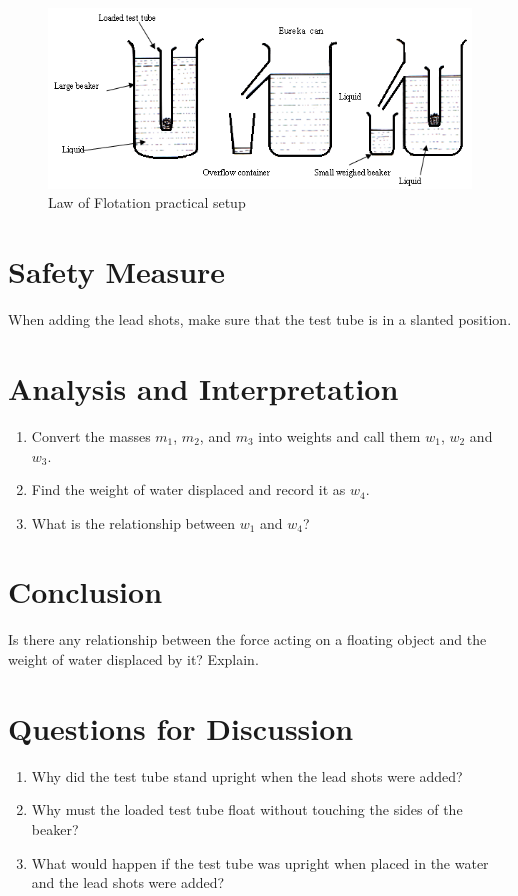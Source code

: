 \begin{figure}[h!]
\centering
\includegraphics[width=14cm]{./img/law-of-flotation-1.png}
\caption{Law of Flotation practical setup}
\label{fig:law-of-flotation-1}
\end{figure}

\section{Safety Measure}
When adding the lead shots, make sure that the test tube is in a slanted position.

\section{Analysis and Interpretation}
\begin{enumerate}
\item Convert the masses $m_1$, $m_2$, and $m_3$ into weights and call them $w_1$, $w_2$ and $w_3$. 
\item Find the weight of water displaced and record it as $w_4$.
\item What is the relationship between $w_1$ and $w_4$?
\end{enumerate}

\section{Conclusion}
Is there any relationship between the force acting on a floating object and the weight of water displaced by it? Explain.

\section{Questions for Discussion}
\begin{enumerate}
\item Why did the test tube stand upright when the lead shots were added?
\item Why must the loaded test tube float without touching the sides of the beaker?
\item What would happen if the test tube was upright when placed in the water and the lead shots were added?
\end{enumerate}

